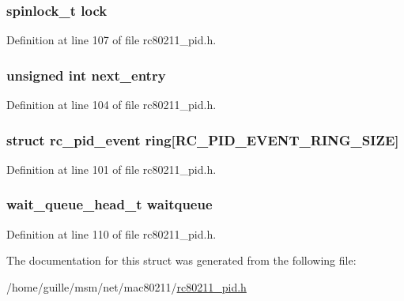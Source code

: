 \hypertarget{structrc__pid__event__buffer_a79cda015c79ff2b4c1444e3070f0bb5d}{
\subsubsection[{lock}]{\setlength{\rightskip}{0pt plus 5cm}spinlock\-\_\-t lock}}\label{structrc__pid__event__buffer_a79cda015c79ff2b4c1444e3070f0bb5d}


Definition at line 107 of file rc80211\-\_\-pid.\-h.

\hypertarget{structrc__pid__event__buffer_a504ce2058dfc4cdd4cf89d9e63c34b89}{
\subsubsection[{next\-\_\-entry}]{\setlength{\rightskip}{0pt plus 5cm}unsigned int next\-\_\-entry}}\label{structrc__pid__event__buffer_a504ce2058dfc4cdd4cf89d9e63c34b89}


Definition at line 104 of file rc80211\-\_\-pid.\-h.

\hypertarget{structrc__pid__event__buffer_ac15c562561ecad08ac70a1b809622c66}{
\subsubsection[{ring}]{\setlength{\rightskip}{0pt plus 5cm}struct {\bf rc\-\_\-pid\-\_\-event} ring\mbox{[}{\bf R\-C\-\_\-\-P\-I\-D\-\_\-\-E\-V\-E\-N\-T\-\_\-\-R\-I\-N\-G\-\_\-\-S\-I\-Z\-E}\mbox{]}}}\label{structrc__pid__event__buffer_ac15c562561ecad08ac70a1b809622c66}


Definition at line 101 of file rc80211\-\_\-pid.\-h.

\hypertarget{structrc__pid__event__buffer_a24489217320b81c842b7d32aa13ff863}{
\subsubsection[{waitqueue}]{\setlength{\rightskip}{0pt plus 5cm}wait\-\_\-queue\-\_\-head\-\_\-t waitqueue}}\label{structrc__pid__event__buffer_a24489217320b81c842b7d32aa13ff863}


Definition at line 110 of file rc80211\-\_\-pid.\-h.



The documentation for this struct was generated from the following file\-:\begin{DoxyCompactItemize}
\item 
/home/guille/msm/net/mac80211/\hyperlink{rc80211__pid_8h}{rc80211\-\_\-pid.\-h}\end{DoxyCompactItemize}

